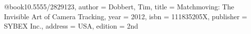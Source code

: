 @book{10.5555/2829123,
author = {Dobbert, Tim},
title = {Matchmoving: The Invisible Art of Camera Tracking},
year = {2012},
isbn = {111835205X},
publisher = {SYBEX Inc.},
address = {USA},
edition = {2nd}
}
